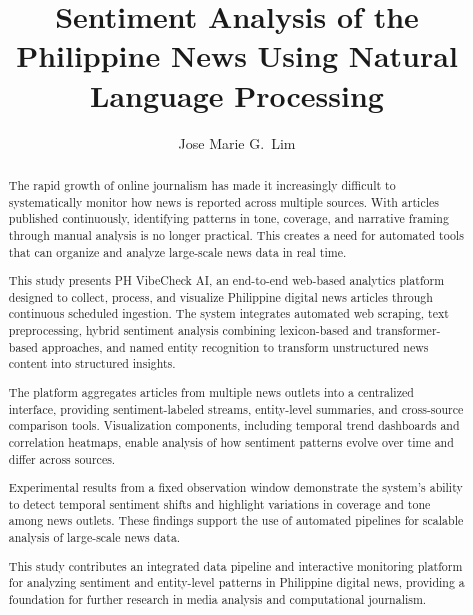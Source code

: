\documentclass[sigconf, nonacm]{acmart}
\begin{document}
\title[]{Sentiment Analysis of the Philippine News Using Natural Language Processing}

\author{Jose Marie G.\ Lim}

\begin{abstract}
The rapid growth of online journalism has made it increasingly difficult to systematically monitor how news is reported across multiple sources. With articles published continuously, identifying patterns in tone, coverage, and narrative framing through manual analysis is no longer practical. This creates a need for automated tools that can organize and analyze large-scale news data in real time.

This study presents PH VibeCheck AI, an end-to-end web-based analytics platform designed to collect, process, and visualize Philippine digital news articles through continuous scheduled ingestion. The system integrates automated web scraping, text preprocessing, hybrid sentiment analysis combining lexicon-based and transformer-based approaches, and named entity recognition to transform unstructured news content into structured insights.

The platform aggregates articles from multiple news outlets into a centralized interface, providing sentiment-labeled streams, entity-level summaries, and cross-source comparison tools. Visualization components, including temporal trend dashboards and correlation heatmaps, enable analysis of how sentiment patterns evolve over time and differ across sources.

Experimental results from a fixed observation window demonstrate the system’s ability to detect temporal sentiment shifts and highlight variations in coverage and tone among news outlets. These findings support the use of automated pipelines for scalable analysis of large-scale news data.

This study contributes an integrated data pipeline and interactive monitoring platform for analyzing sentiment and entity-level patterns in Philippine digital news, providing a foundation for further research in media analysis and computational journalism.
\end{abstract}

\end{document}
